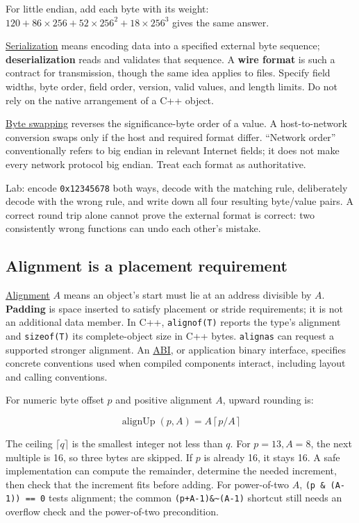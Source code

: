 For little endian, add each byte with its weight: \(120+86\times256+52\times256^2+18\times256^3\) gives the same answer.

\hyperref[appendix-91d09ebed979]{Serialization} means encoding data into a specified external byte sequence; \textbf{deserialization} reads and validates that sequence. A \textbf{wire format} is such a contract for transmission, though the same idea applies to files. Specify field widths, byte order, field order, version, valid values, and length limits. Do not rely on the native arrangement of a C++ object.

\hyperref[appendix-11ba36693aa2]{Byte swapping} reverses the significance-byte order of a value. A host-to-network conversion swaps only if the host and required format differ. ``Network order'' conventionally refers to big endian in relevant Internet fields; it does not make every network protocol big endian. Treat each format as authoritative.

Lab: encode \texttt{0x12345678} both ways, decode with the matching rule, deliberately decode with the wrong rule, and write down all four resulting byte/value pairs. A correct round trip alone cannot prove the external format is correct: two consistently wrong functions can undo each other's mistake.

\subsection{Alignment is a placement requirement}\label{01-foundations-i-ch002-alignment-is-a-placement-requirement}

\hyperref[appendix-a1f7c53b4742]{Alignment} \(A\) means an object's start must lie at an address divisible by \(A\). \textbf{Padding} is space inserted to satisfy placement or stride requirements; it is not an additional data member. In C++, \texttt{alignof(T)} reports the type's alignment and \texttt{sizeof(T)} its complete-object size in C++ bytes. \texttt{alignas} can request a supported stronger alignment. An \hyperref[appendix-c4ac6bb0fff8]{ABI}, or application binary interface, specifies concrete conventions used when compiled components interact, including layout and calling conventions.

For numeric byte offset \(p\) and positive alignment \(A\), upward rounding is:

\[
\operatorname{alignUp}(p,A)=A\left\lceil p/A\right\rceil
\]

The ceiling \(\lceil q\rceil\) is the smallest integer not less than \(q\). For \(p=13,A=8\), the next multiple is 16, so three bytes are skipped. If \(p\) is already 16, it stays 16. A safe implementation can compute the remainder, determine the needed increment, then check that the increment fits before adding. For power-of-two \(A\), \texttt{(p\ \&\ (A-1))\ ==\ 0} tests alignment; the common \texttt{(p+A-1)\&\textasciitilde{}(A-1)} shortcut still needs an overflow check and the power-of-two precondition.

